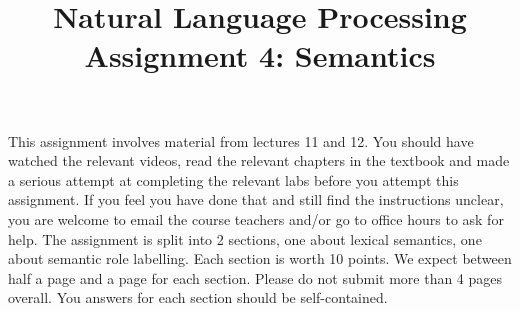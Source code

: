 \documentclass[11pt]{article}
\title{{\LARGE Natural Language Processing}\\[1.5mm]{\large Assignment 4: Semantics}}
\author{}
\date{} %
\begin{document}
 


\maketitle
\noindent This assignment involves material from lectures 11 and
12. You should have watched the relevant videos, read the relevant
chapters in the textbook and made a serious attempt at completing the
relevant labs before you attempt this assignment.  If you feel you
have done that and still find the instructions unclear, you are
welcome to email the course teachers and/or go to office hours to ask
for help.  The assignment is split into 2 sections, one about lexical
semantics, one about semantic role labelling. Each section is worth 10
points. We expect between half a page and a page for each
section. Please do not submit more than 4 pages overall.  You answers
for each section should be self-contained.
\end{document}
